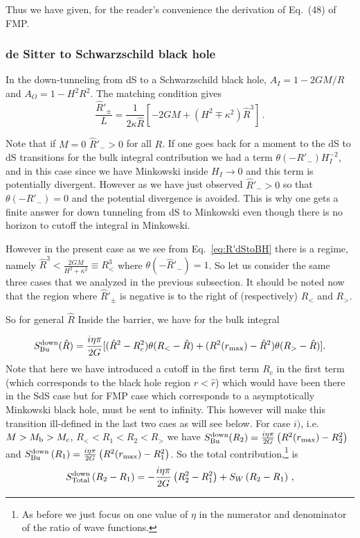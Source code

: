 \documentclass[a4paper,11pt]{article}
\numberwithin{equation}{section}
\newcommand{\be}{\begin{equation}}
\newcommand{\ee}{\end{equation}}
\numberwithin{equation}{section}
\begin{document}
Thus we have given,  for the reader's convenience the derivation of Eq.~(48) of FMP.

\subsubsection{de Sitter to Schwarzschild black hole}

In the down-tunneling from dS to a Schwarzschild black hole, $A_{I}=1-2GM/R$ and $A_{O}=1-H^{2}R^{2}$. The matching condition gives
\begin{equation}
\frac{\hat{R}'_{\pm}}{L}=\frac{1}{2\kappa\hat{R}}\left[-2GM+\left(H^{2}\mp\kappa^{2}\right)\hat{R}^{3}\right]\,.\label{eq:R'dStoBH}
\end{equation}

Note that if $M=0$ $\hat{R}'_{-}>0$ for all $R$. If one goes back
for a moment to the dS to dS transitions for the bulk integral contribution
we had a term $\theta\left(-R'_{-}\right)H_{I}^{-2}$, and in this
case since we have Minkowski inside $H_{I}\rightarrow0$ and this
term is potentially divergent. However as we have just observed $\hat{R}'_{-}>0$
so that $\theta\left(-R'_{-}\right)=0$ and the potential divergence is avoided. This is why one gets a finite answer for down tunneling from dS to Minkowski even though there is no horizon to cutoff the integral in Minkowski. 

However in the present case as we see from Eq.~\eqref{eq:R'dStoBH} there
is a regime, namely $\hat{R}^{3}<\frac{2GM}{H^{2}+\kappa^{2}}\equiv R_{<}^{3}$ where $\theta\left(-\hat{R}'_{-}\right)=1$. So let us consider the same three cases that we analyzed in the previous subsection. It should be noted now that the region where $\hat R'_{\pm }$ is negative is to the right of (respectively) $R_<$ and $R_>$. 

So for general $\hat R $ Inside the barrier, we have for the bulk integral

\begin{equation}
S_{{\rm Bu}}^{{\rm down}}(\hat R)=\frac{i\eta\pi}{2G}[(\hat R^2-R^2_{c})\theta (R_<-\hat R)+(R^2(r_{{\rm max}})-\hat R^2)\theta (R_>-\hat R)].\label{eq:BHtodS}
\end{equation}
Note that here we have introduced a cutoff in the first term $R_c$ in the first term  (which corresponds to the black hole region $r<\hat r$) which would have been there in the SdS case but for FMP case which corresponds to a asymptotically Minkowski black hole, must be sent to infinity. This however will make this transition ill-defined in the last two caes as  will see below.
For case $i)$, i.e. $M>M_{{\rm b}}>M_{c}$, $R_{<}<R_{1}<R_{2}<R_{>}$ we have $S_{{\rm Bu}}^{{\rm down}}(R_{2})=\frac{i\eta\pi}{2G}\left(R^{2}(r_{\rm max})-R_{2}^{2}\right)$ and $S_{{\rm Bu}}^{{\rm down}}\left(R_{1}\right)=\frac{i\eta\pi}{2G}\left(R^{2}(r_{\rm max})-R_{1}^{2}\right)$.
So the total contribution,\footnote{As before we just focus on one value of $\eta$ in the numerator and denominator of the ratio of wave functions.} is 
\be
S_{{\rm Total}}^{{\rm down}}\left(R_{2}-R_{1}\right)=-\frac{i\eta\pi}{2G}\left(R_{2}^{2}-R_{1}^{2}\right)+S_{W}\left(R_{2}-R_{1}\right) \,,
\ee
\end{document}
